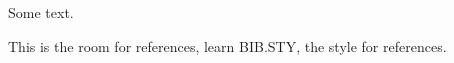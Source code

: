 Some text.


\bbib
This is the room for references, learn BIB.STY, the style for references.
\ebib

\stopbodymatter


\setupsectionblock[backmatter][before={\setuplist[kap][before={}]}]

\startbackmatter


\stopbackmatter


\startappendices


\stopappendices

\stopthesis

\endinput		

Here you can write your own comments which will not be included to the output PDF file.

